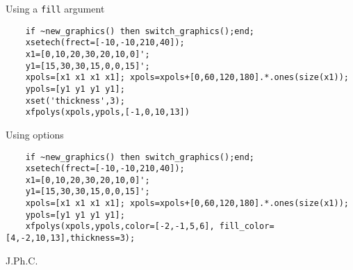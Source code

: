 \begin{examples}

\noindent Using a \verb!fill! argument
  \begin{Verbatim}
    if ~new_graphics() then switch_graphics();end;
    xsetech(frect=[-10,-10,210,40]);
    x1=[0,10,20,30,20,10,0]';
    y1=[15,30,30,15,0,0,15]';
    xpols=[x1 x1 x1 x1]; xpols=xpols+[0,60,120,180].*.ones(size(x1));
    ypols=[y1 y1 y1 y1];
    xset('thickness',3);
    xfpolys(xpols,ypols,[-1,0,10,13])
  \end{Verbatim}

\noindent Using options
  \begin{Verbatim}
    if ~new_graphics() then switch_graphics();end;
    xsetech(frect=[-10,-10,210,40]);
    x1=[0,10,20,30,20,10,0]';
    y1=[15,30,30,15,0,0,15]';
    xpols=[x1 x1 x1 x1]; xpols=xpols+[0,60,120,180].*.ones(size(x1));
    ypols=[y1 y1 y1 y1];
    xfpolys(xpols,ypols,color=[-2,-1,5,6], fill_color=[4,-2,10,13],thickness=3);
  \end{Verbatim}

\end{examples}

\begin{manseealso}
    
\end{manseealso}


\begin{authors}
  J.Ph.C.

\end{authors}
